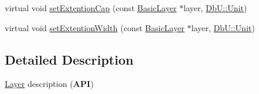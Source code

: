 \begin{DoxyCompactItemize}
\item 
virtual void \mbox{\hyperlink{classHurricane_1_1Layer_a55c7b39e000442ea36a0774d26b7fbde}{set\+Extention\+Cap}} (const \mbox{\hyperlink{classHurricane_1_1BasicLayer}{Basic\+Layer}} $\ast$layer, \mbox{\hyperlink{group__DbUGroup_ga4fbfa3e8c89347af76c9628ea06c4146}{Db\+U\+::\+Unit}})
\item 
virtual void \mbox{\hyperlink{classHurricane_1_1Layer_a7a6943dbcb3403aff34056cd5de00e66}{set\+Extention\+Width}} (const \mbox{\hyperlink{classHurricane_1_1BasicLayer}{Basic\+Layer}} $\ast$layer, \mbox{\hyperlink{group__DbUGroup_ga4fbfa3e8c89347af76c9628ea06c4146}{Db\+U\+::\+Unit}})
\end{DoxyCompactItemize}


\subsection{Detailed Description}
\mbox{\hyperlink{classHurricane_1_1Layer}{Layer}} description ({\bfseries A\+PI}) 

